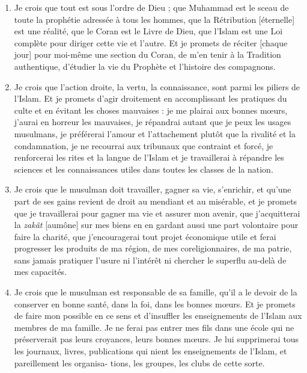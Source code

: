 \begin{enumerate}
\def\labelenumi{\arabic{enumi}.}
\item
  
  Je crois que tout est sous l'ordre de Dieu ; que Muhammad est le sceau
  de toute la prophétie adressée à tous les hommes, que la Rétribution
  {[}éternelle{]} est une réalité, que le Coran est le Livre de Dieu,
  que l'Islam est une Loi complète pour diriger cette vie et l'autre. Et
  je promets de réciter {[}chaque jour{]} pour moi-même une section du
  Coran, de m'en tenir à la Tradition authentique, d'étudier la vie du
  Prophète et l'histoire des compagnons.
  
\item
  
  Je crois que l'action droite, la vertu, la connaissance, sont parmi
  les piliers de l'Islam. Et je promets d'agir droitement en
  accomplissant les pratiques du culte et en évitant les choses
  mauvaises : je me plairai aux bonnes mœurs, j'aurai en horreur les
  mauvaises, je répandrai autant que je peux les usages musulmans, je
  préférerai l'amour et l'attachement plutôt que la rivalité et la
  condamnation, je ne recourrai aux tribunaux que contraint et forcé, je
  renforcerai les rites et la langue de l'Islam et je travaillerai à
  répandre les sciences et les connaissances utiles dans toutes les
  classes de la nation.
  
\item
  
  Je crois que le musulman doit travailler, gagner sa vie, s'enrichir,
  et qu'une part de ses gains revient de droit au mendiant et au
  misérable, et je promets que je travaillerai pour gagner ma vie et
  assurer mon avenir, que j'acquitterai la \emph{zakât} {[}aumône{]} sur
  mes biens en en gardant aussi une part volontaire pour faire la
  charité, que j'encouragerai tout projet économique utile et ferai
  progresser les produits de ma région, de mes coreligionnaires, de ma
  patrie, sans jamais pratiquer l'usure ni l'intérêt ni chercher le
  superflu au-delà de mes capacités.
  
\item
  
  Je crois que le musulman est responsable de sa famille, qu'il a le
  devoir de la conserver en bonne santé, dans la foi, dans les bonnes
  mœurs. Et je promets de faire mon possible en ce sens et d'insuffler
  les enseignements de l'Islam aux membres de ma famille. Je ne ferai
  pas entrer mes fils dans une école qui ne préserverait pas leurs
  croyances, leurs bonnes mœurs. Je lui supprimerai tous les journaux,
  livres, publications qui nient les enseignements de l'Islam, et
  pareillement les organisa- tions, les groupes, les clubs de cette
  sorte.
  

\end{enumerate}
